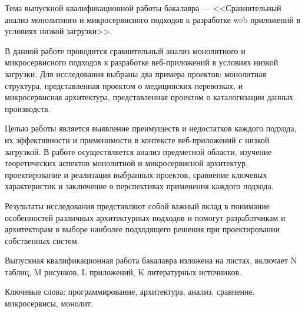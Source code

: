 
Тема выпускной квалификационной работы бакалавра --- <<Сравнительный анализ монолитного и микросервисного подходов к разработке web приложений в условиях низкой загрузки>>.

В данной работе проводится сравнительный анализ монолитного и микросервисного подходов к разработке веб-приложений в условиях низкой загрузки. Для исследования выбраны два примера проектов: монолитная структура, представленная проектом о медицинских перевозках, и микросервисная архитектура, представленная проектом о каталогизации данных производств.

Целью работы является выявление преимуществ и недостатков каждого подхода, их эффективности и применимости в контексте веб-приложений с низкой загрузкой. В работе осуществляется анализ предметной области, изучение теоретических аспектов монолитной и микросервисной архитектур, проектирование и реализация выбранных проектов, сравнение ключевых характеристик и заключение о перспективах применения каждого подхода.

Результаты исследования представляют собой важный вклад в понимание особенностей различных архитектурных подходов и помогут разработчикам и архитекторам в выборе наиболее подходящего решения при проектировании собственных систем.

Выпускная квалификационная работа бакалавра изложена на \pageref{LastPage} листах, включает N таблиц, M рисунков, L приложений, K литературных источников. 


Ключевые слова: программирование, архитектура, анализ, сравнение, микросервисы, монолит.

\clearpage